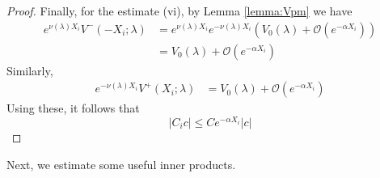 \documentclass[thesis.tex]{subfiles}
\begin{document}
\begin{lemma}
\begin{proof}
Finally, for the estimate (vi), by Lemma \ref{lemma:Vpm} we have
\begin{align*}
e^{\nu(\lambda) X_i} V^-(-X_i; \lambda) 
&= e^{\nu(\lambda) X_i} e^{-\nu(\lambda) X_i}\left(V_0(\lambda) + \mathcal{O}(e^{-\alpha X_i}) \right) \\
&= V_0(\lambda) + \mathcal{O}(e^{-\alpha X_i})
\end{align*}
Similarly,
\begin{align*}
e^{-\nu(\lambda) X_i} V^+(X_i; \lambda)
&= V_0(\lambda) + \mathcal{O}(e^{-\alpha X_i})
\end{align*}
Using these, it follows that
\[
|C_i c| \leq C e^{-\alpha X_i} |c|
\]
\end{proof}
\end{lemma}

Next, we estimate some useful inner products.
\end{document}
